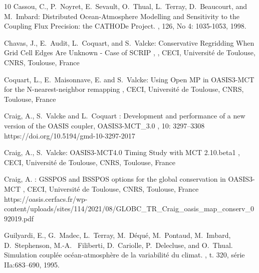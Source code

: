\newpage
\begin{thebibliography}{10}
\vspace{-0.3cm}
Cassou, C., P.~Noyret, E.~Sevault, O.~Thual, L.~Terray, D.~Beaucourt, and
  M.~Imbard:
\newblock Distributed Ocean-Atmosphere Modelling and Sensitivity to the
  Coupling Flux Precision: the CATHODe Project.
, 126, No 4: 1035-1053, 1998.

Chavas, J., E.~Audit, L.~Coquart, and S.~Valcke:
\newblock Conservative Regridding When Grid Cell Edges Are Unknown - Case of SCRIP
,
,
\newblock CECI, Universit\'e de Toulouse, CNRS, Toulouse, France

Coquart, L., E.~Maisonnave, E. and S.~Valcke:
\newblock Using Open MP in OASIS3-MCT for the N-nearest-neighbor remapping
,
\newblock CECI, Universit\'e de Toulouse, CNRS, Toulouse, France

Craig, A., S.~Valcke and L.~Coquart :
\newblock Development and performance of a new version of the OASIS coupler, OASIS3-MCT\_3.0
, 10: 3297--3308
\newblock https://doi.org/10.5194/gmd-10-3297-2017

Craig, A., S.~Valcke:
\newblock OASIS3-MCT4.0 Timing Study with MCT 2.10.beta1
,
\newblock CECI, Universit\'e de Toulouse, CNRS, Toulouse, France

Craig, A. :
\newblock GSSPOS and BSSPOS options for the global conservation in OASIS3-MCT
,
\newblock CECI, Universit\'e de Toulouse, CNRS, Toulouse, France
\newblock https://oasis.cerfacs.fr/wp-content/uploads/sites/114/2021/08/GLOBC\_TR\_Craig\_oasis\_map\_conserv\_092019.pdf

Guilyardi, E., G.~Madec, L.~Terray, M.~D\'equ\'e, M.~Pontaud, M.~Imbard, D.~Stephenson, M.-A. ~Filiberti, D.~Cariolle, P.~Delecluse, and O.~Thual.
\newblock Simulation coupl\'ee oc\'ean-atmosph\`ere de la variabilit\'e du climat.
, t. 320, s\'erie IIa:683--690, 1995.


\end{thebibliography}
